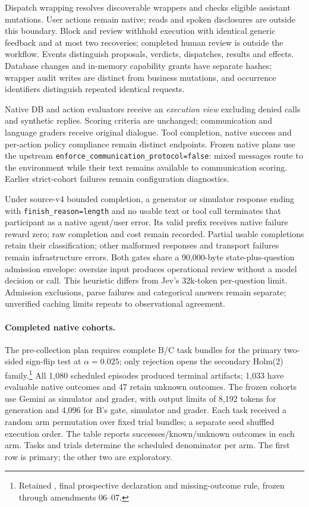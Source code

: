 Dispatch wrapping resolves discoverable wrappers and checks eligible assistant
mutations. User actions remain native; reads and spoken disclosures are outside
this boundary. Block and review withhold execution with identical generic
feedback and at most two recoveries; completed human review is outside the
workflow. Events distinguish proposals, verdicts, dispatches, results and
effects. Database changes and in-memory capability grants have separate
hashes; wrapper audit writes are distinct from business mutations, and
occurrence identifiers distinguish repeated identical requests.

Native DB and action evaluators receive an \emph{execution view} excluding
denied calls and synthetic replies. Scoring criteria are unchanged;
communication and language graders receive original dialogue. Tool completion,
native success and per-action policy compliance remain distinct endpoints.
Frozen native plans use the upstream
\texttt{enforce\_communication\_protocol=false}: mixed messages route to the
environment while their text remains available to communication scoring.
Earlier strict-cohort failures remain configuration diagnostics.

Under source-v4 bounded completion, a generator or simulator response ending
with \texttt{finish\_reason=length} and no usable text or tool call terminates
that participant as a native agent/user error. Its valid prefix receives native
failure reward zero; raw completion and cost remain recorded. Partial usable
completions retain their classification; other malformed responses and
transport failures remain infrastructure errors. Both gates share a
90,000-byte state-plus-question admission envelope: oversize input produces
operational review without a model decision or call. This heuristic differs
from Jev's 32k-token per-question limit. Admission exclusions, parse failures
and categorical answers remain separate; unverified caching limits repeats
to observational agreement.

\paragraph{Completed native cohorts.}
The pre-collection plan requires complete B/C task bundles for the primary
two-sided sign-flip test at $\alpha=0.025$; only rejection opens the secondary
Holm(2) family.\footnote{Retained , final prospective
declaration and missing-outcome rule, frozen through amendments 06--07.}
All 1,080 scheduled episodes produced terminal artifacts; 1,033 have evaluable
native outcomes and 47 retain unknown outcomes. The frozen cohorts use Gemini
as simulator and grader, with output limits of 8,192 tokens for generation
and 4,096 for B's gate, simulator and grader. Each task received a random arm
permutation over fixed trial bundles; a separate seed shuffled execution order.
The table reports successes/known/unknown outcomes in each arm. Tasks and
trials determine the scheduled denominator per arm. The first row is primary;
the other two are exploratory.

